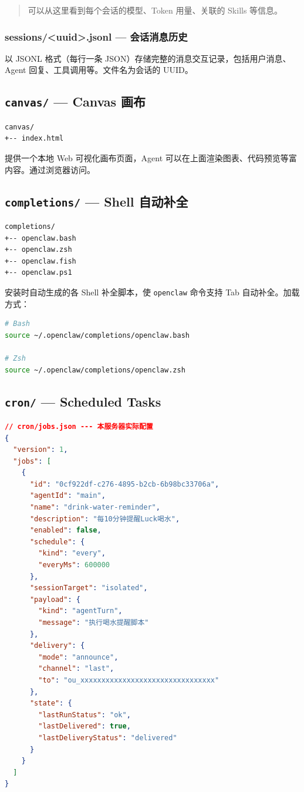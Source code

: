 \begin{quote}
可以从这里看到每个会话的模型、Token 用量、关联的 Skills 等信息。
\end{quote}

\subsubsection{sessions/<uuid>.jsonl --- 会话消息历史}


以 JSONL 格式（每行一条 JSON）存储完整的消息交互记录，包括用户消息、Agent 回复、工具调用等。文件名为会话的 UUID。

\subsection{\texttt{canvas/} --- Canvas 画布}


\begin{lstlisting}
canvas/
+-- index.html
\end{lstlisting}

提供一个本地 Web 可视化画布页面，Agent 可以在上面渲染图表、代码预览等富内容。通过浏览器访问。

\subsection{\texttt{completions/} --- Shell 自动补全}


\begin{lstlisting}
completions/
+-- openclaw.bash
+-- openclaw.zsh
+-- openclaw.fish
+-- openclaw.ps1
\end{lstlisting}

安装时自动生成的各 Shell 补全脚本，使 \texttt{openclaw} 命令支持 Tab 自动补全。加载方式：

\begin{lstlisting}[language=bash]
# Bash
source ~/.openclaw/completions/openclaw.bash

# Zsh
source ~/.openclaw/completions/openclaw.zsh
\end{lstlisting}

\subsection{\texttt{cron/} --- Scheduled Tasks}


\begin{lstlisting}[language=json]
// cron/jobs.json --- 本服务器实际配置
{
  "version": 1,
  "jobs": [
    {
      "id": "0cf922df-c276-4895-b2cb-6b98bc33706a",
      "agentId": "main",
      "name": "drink-water-reminder",
      "description": "每10分钟提醒Luck喝水",
      "enabled": false,
      "schedule": {
        "kind": "every",
        "everyMs": 600000
      },
      "sessionTarget": "isolated",
      "payload": {
        "kind": "agentTurn",
        "message": "执行喝水提醒脚本"
      },
      "delivery": {
        "mode": "announce",
        "channel": "last",
        "to": "ou_xxxxxxxxxxxxxxxxxxxxxxxxxxxxxxxx"
      },
      "state": {
        "lastRunStatus": "ok",
        "lastDelivered": true,
        "lastDeliveryStatus": "delivered"
      }
    }
  ]
}
\end{lstlisting}


